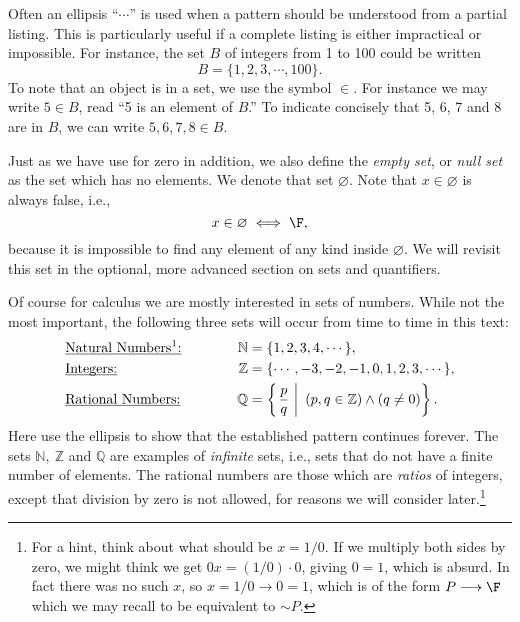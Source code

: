 Often an ellipsis ``$\cdots$'' is used when a pattern should be
understood from a partial listing.  This is particularly useful if
a complete listing is either impractical or impossible.  For instance,
the set $B$ of integers from 1 to 100 
could be written
$$B=\{1,2,3,\cdots,100\}.$$
To note that an object is in a set, we use the symbol $\in$.  For instance
we may write $5\in B$, read ``5 is an element of $B$.''  To
indicate concisely that 5, 6, 7 and 8 are in $B$, we can write
$5,6,7,8\in B$.

Just as we have use for zero in addition, we also define
the {\it empty set}, or {\it null set} as the set which
has no elements.  We denote that set $\varnothing$.  Note
that $x\in\varnothing$ is always false, i.e., 
$$x\in\varnothing\iff \F,$$
because it is impossible to find any element of any kind inside $\varnothing.$
We will revisit this set in the optional, more advanced section
on sets and quantifiers.


Of course for calculus we are mostly interested in sets of numbers.
While not the most important,
the following three sets will occur from time to time in this text:
\begin{alignat}{3} 
&\text{\underline{Natural Numbers\footnotemark:}}
        &\qquad&&\mathbb{N}&=\{1,2,3,4,\cdots\},\\ 
&\text{\underbar{Integers:}}&&&
        \mathbb{Z}&=\{\cdots,-3,-2,-1,0,1,2,3,\cdots\},\\
&\text{\underline{Rational Numbers:}}&&&\mathbb{Q}&=
        \left\{\left.\frac{p}q\ \right|\ (p,q\in\mathbb{Z})\wedge(q\ne0) 
\right\}.\end{alignat} 
%
Here  use the ellipsis to show that the established pattern continues
forever.
The sets  $\mathbb{N,\ Z}$ and $\mathbb{Q}$ are
examples of {\it infinite} sets, i.e., sets that do not have a finite
number of elements.  The rational
numbers are those which are {\it ratios} of integers, except that
division by zero is not allowed, for reasons we will consider
later.\footnote{%
For a hint, think about what should be $x=1/0$.  If we multiply
both sides by zero, we might think we get
$0x=(1/0)\cdot0$, giving $0=1$, which is absurd.  
In fact there was no such $x$, so $x=1/0\rightarrow 0=1$, which
is of the form $P\longrightarrow\F$ which we may recall to be
equivalent to $\sim P$.
}



